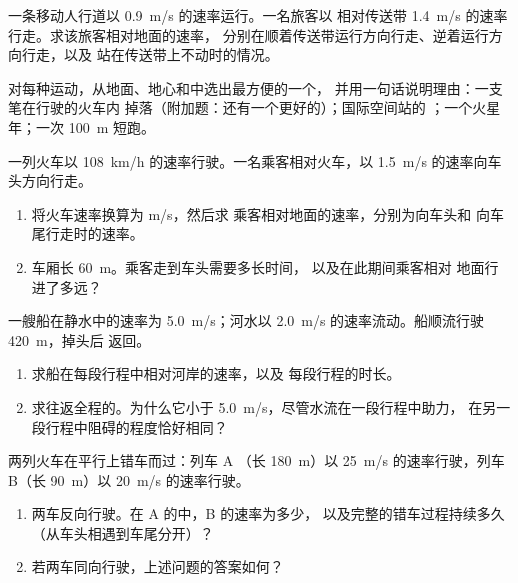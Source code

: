 \begin{exercise}[$\star$]\label{exo:g10:relative-motion:4}
一条移动人行道以 \qty{0.9}{m/s} 的速率运行。一名旅客以
相对传送带 \qty{1.4}{m/s} 的速率行走。求该旅客相对地面的速率，
分别在顺着传送带运行方向行走、逆着运行方向行走，以及
站在传送带上不动时的情况。
\end{exercise}

\begin{exercise}[$\star$]\label{exo:g10:relative-motion:5}
对每种运动，从地面、地心和中选出最方便的一个，
并用一句话说明理由：一支笔在行驶的火车内
掉落（附加题：还有一个更好的）；国际空间站的
；一个火星年；一次
\qty{100}{m} 短跑。
\end{exercise}

\begin{exercise}[$\star\star$]\label{exo:g10:relative-motion:6}
一列火车以 \qty{108}{km/h} 的速率行驶。一名乘客相对火车，以
\qty{1.5}{m/s} 的速率向车头方向行走。
\begin{enumerate}
  \item 将火车速率换算为 \unit{m/s}，然后求
        乘客相对地面的速率，分别为向车头和
        向车尾行走时的速率。
  \item 车厢长 \qty{60}{m}。乘客走到车头需要多长时间，
        以及在此期间乘客相对
        地面行进了多远？
\end{enumerate}
\end{exercise}

\begin{exercise}[$\star\star$]\label{exo:g10:relative-motion:7}
一艘船在静水中的速率为 \qty{5.0}{m/s}；河水以
\qty{2.0}{m/s} 的速率流动。船顺流行驶 \qty{420}{m}，掉头后
返回。
\begin{enumerate}
  \item 求船在每段行程中相对河岸的速率，以及
        每段行程的时长。
  \item 求往返全程的。为什么它小于
        \qty{5.0}{m/s}，尽管水流在一段行程中助力，
        在另一段行程中阻碍的程度恰好相同？
\end{enumerate}
\end{exercise}

\begin{exercise}[$\star\star$]\label{exo:g10:relative-motion:8}
两列火车在平行上错车而过：列车 A
（长 \qty{180}{m}）以 \qty{25}{m/s} 的速率行驶，列车 B（长 \qty{90}{m}）以 \qty{20}{m/s} 的速率行驶。
\begin{enumerate}
  \item 两车反向行驶。在 A 的中，B 的速率为多少，
        以及完整的错车过程持续多久
        （从车头相遇到车尾分开）？
  \item 若两车同向行驶，上述问题的答案如何？
\end{enumerate}
\end{exercise}

